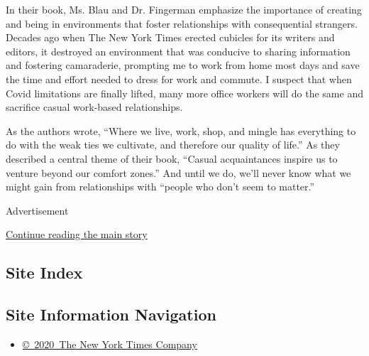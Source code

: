 In their book, Ms. Blau and Dr. Fingerman emphasize the importance of
creating and being in environments that foster relationships with
consequential strangers. Decades ago when The New York Times erected
cubicles for its writers and editors, it destroyed an environment that
was conducive to sharing information and fostering camaraderie,
prompting me to work from home most days and save the time and effort
needed to dress for work and commute. I suspect that when Covid
limitations are finally lifted, many more office workers will do the
same and sacrifice casual work-based relationships.

As the authors wrote, ``Where we live, work, shop, and mingle has
everything to do with the weak ties we cultivate, and therefore our
quality of life.'' As they described a central theme of their book,
``Casual acquaintances inspire us to venture beyond our comfort zones.''
And until we do, we'll never know what we might gain from relationships
with ``people who don't seem to matter.''

Advertisement

\protect\hyperlink{after-bottom}{Continue reading the main story}

\hypertarget{site-index}{%
\subsection{Site Index}\label{site-index}}

\hypertarget{site-information-navigation}{%
\subsection{Site Information
Navigation}\label{site-information-navigation}}

\begin{itemize}
\tightlist
\item
  \href{https://help.nytimes.com/hc/en-us/articles/115014792127-Copyright-notice}{©~2020~The
  New York Times Company}
\end{itemize}

